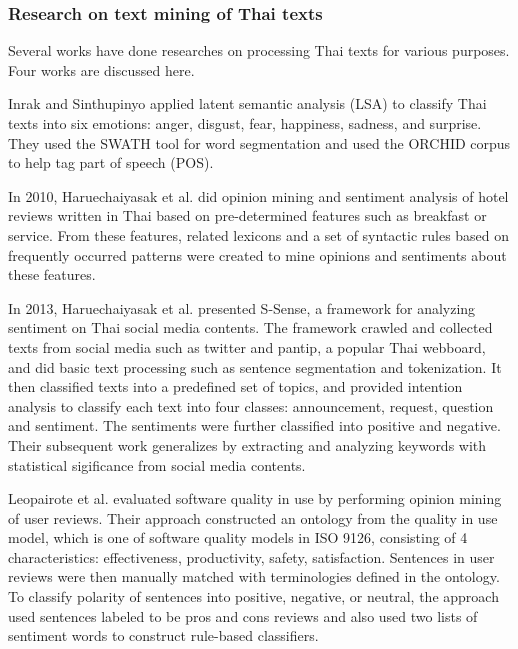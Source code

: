 \subsubsection{Research on text mining of Thai texts} Several works have done researches on processing Thai texts for various purposes. Four works are discussed here.

Inrak and Sinthupinyo \cite{emotioninthai} applied latent semantic analysis (LSA) \cite{LSA} to classify Thai texts into six emotions: anger, disgust, fear, happiness, sadness, and surprise. They used the SWATH \cite{SWATH} tool for word segmentation and used the ORCHID \cite{ORCHID} corpus to help tag part of speech (POS).

In 2010, Haruechaiyasak et al. \cite{thaiopinionmininghotel} did opinion mining and sentiment analysis of hotel reviews written in Thai based on pre-determined features such as breakfast or service. From these features, related lexicons and a set of syntactic rules based on frequently occurred patterns were created to mine opinions and sentiments about these features.

In 2013, Haruechaiyasak et al. \cite{ssense} presented S-Sense, a framework for analyzing sentiment on Thai social media contents. The framework crawled and collected texts from social media such as twitter and pantip, a popular Thai webboard, and did basic text processing such as sentence segmentation and tokenization. It then classified texts into a predefined set of topics, and provided intention analysis to classify each text into four classes: announcement, request, question and sentiment. The sentiments were further classified into positive and negative. Their subsequent work \cite{ssense2} generalizes by extracting and analyzing keywords with statistical sigificance from social media contents.

Leopairote et al. \cite{leopairote1,leopairote2} evaluated software quality in use by performing opinion mining of user reviews. Their approach constructed an ontology from the quality in use model, which is one of software quality models in ISO 9126, consisting of 4 characteristics: effectiveness, productivity, safety, satisfaction. Sentences in user reviews were then manually matched with terminologies defined in the ontology. To classify polarity of sentences into positive, negative, or neutral, the approach used sentences labeled to be pros and cons reviews and also used two lists of sentiment words to construct rule-based classifiers.

